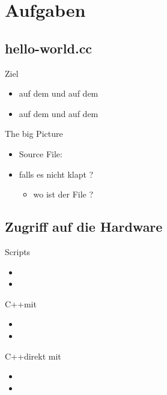 \section{Aufgaben}

\subsection{hello-world.cc}
\begin{frame}{Ziel}
 \begin{itemize}
  \item {} auf dem \host und auf dem \targetS
  \item {} auf dem \host und auf dem \targetS
 \end{itemize}
\end{frame}


\begin{frame}{The big Picture}
 \begin{itemize}
  \item Source File: 
  \item falls es nicht klapt ?
  \begin{itemize}
   \item wo ist der File ?
  \end{itemize}
 \end{itemize}
\end{frame}

\subsection{Zugriff auf die Hardware}
\begin{frame}{Scripts}
 \begin{itemize}
  \item {}
  \item {}
 \end{itemize}
\end{frame}

\begin{frame}{C++}{mit }
 \begin{itemize}
  \item {}
  \item {}
 \end{itemize}
\end{frame}

\begin{frame}{C++}{direkt mit }
 \begin{itemize}
  \item {}
  \item {}
 \end{itemize}
\end{frame}

